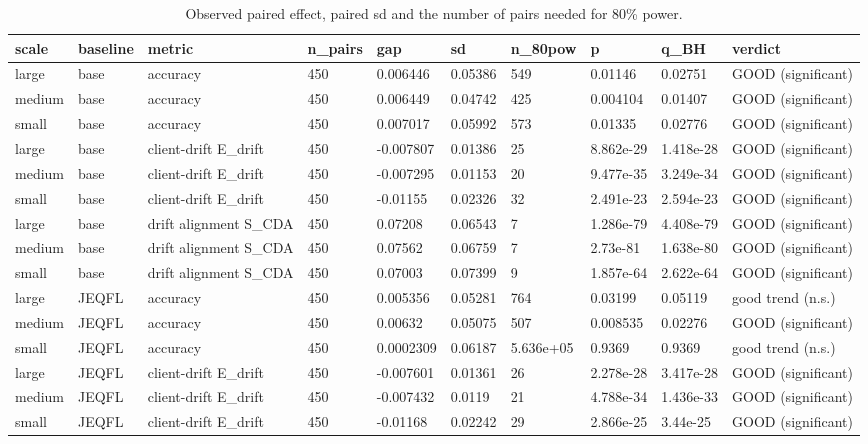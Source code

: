 \begin{table}[t]\centering\footnotesize
\caption{Observed paired effect, paired sd and the number of pairs needed for 80\% power.}\label{tab:table12_power}
\begin{tabular}{llllllllll}
\toprule
scale & baseline & metric & n\_pairs & gap & sd & n\_80pow & p & q\_BH & verdict \\
\midrule
large & base & accuracy & 450 & 0.006446 & 0.05386 & 549 & 0.01146 & 0.02751 & GOOD (significant) \\
medium & base & accuracy & 450 & 0.006449 & 0.04742 & 425 & 0.004104 & 0.01407 & GOOD (significant) \\
small & base & accuracy & 450 & 0.007017 & 0.05992 & 573 & 0.01335 & 0.02776 & GOOD (significant) \\
large & base & client-drift E\_drift & 450 & -0.007807 & 0.01386 & 25 & 8.862e-29 & 1.418e-28 & GOOD (significant) \\
medium & base & client-drift E\_drift & 450 & -0.007295 & 0.01153 & 20 & 9.477e-35 & 3.249e-34 & GOOD (significant) \\
small & base & client-drift E\_drift & 450 & -0.01155 & 0.02326 & 32 & 2.491e-23 & 2.594e-23 & GOOD (significant) \\
large & base & drift alignment S\_CDA & 450 & 0.07208 & 0.06543 & 7 & 1.286e-79 & 4.408e-79 & GOOD (significant) \\
medium & base & drift alignment S\_CDA & 450 & 0.07562 & 0.06759 & 7 & 2.73e-81 & 1.638e-80 & GOOD (significant) \\
small & base & drift alignment S\_CDA & 450 & 0.07003 & 0.07399 & 9 & 1.857e-64 & 2.622e-64 & GOOD (significant) \\
large & JEQFL & accuracy & 450 & 0.005356 & 0.05281 & 764 & 0.03199 & 0.05119 & good trend (n.s.) \\
medium & JEQFL & accuracy & 450 & 0.00632 & 0.05075 & 507 & 0.008535 & 0.02276 & GOOD (significant) \\
small & JEQFL & accuracy & 450 & 0.0002309 & 0.06187 & 5.636e+05 & 0.9369 & 0.9369 & good trend (n.s.) \\
large & JEQFL & client-drift E\_drift & 450 & -0.007601 & 0.01361 & 26 & 2.278e-28 & 3.417e-28 & GOOD (significant) \\
medium & JEQFL & client-drift E\_drift & 450 & -0.007432 & 0.0119 & 21 & 4.788e-34 & 1.436e-33 & GOOD (significant) \\
small & JEQFL & client-drift E\_drift & 450 & -0.01168 & 0.02242 & 29 & 2.866e-25 & 3.44e-25 & GOOD (significant) \\

\end{tabular}
\end{table}

